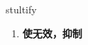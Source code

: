 
\begin{frame}
{\huge stultify}
\begin{center}
\begin{enumerate}\Large
  \item \textbf{使无效，抑制}
\end{enumerate}
\end{center}
\end{frame}
